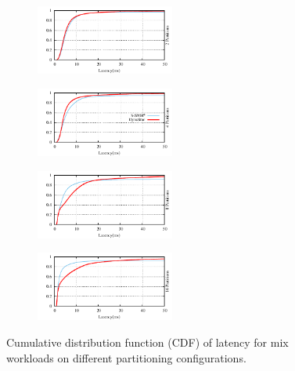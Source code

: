 \begin{figure}[h!]
  \centering
  \begin{subfigure}{\columnwidth}
    \centering
    \includegraphics[width=0.5\textwidth]{./figures/experiments/dynastar/chirper-latency-cdf-2p.pdf}
  \end{subfigure}
  \begin{subfigure}{\columnwidth}
    \centering
    \includegraphics[width=0.5\textwidth]{./figures/experiments/dynastar/chirper-latency-cdf-4p.pdf}
  \end{subfigure}
  \begin{subfigure}{\columnwidth}
    \centering
    \includegraphics[width=0.5\textwidth]{./figures/experiments/dynastar/chirper-latency-cdf-8p.pdf}
  \end{subfigure}
  \begin{subfigure}{\columnwidth}
    \centering
    \includegraphics[width=0.5\textwidth]{./figures/experiments/dynastar/chirper-latency-cdf-16p.pdf}
  \end{subfigure}
  \caption{Cumulative distribution function (CDF) of latency for mix workloads on different partitioning configurations.}
  \label{fig:socialcdf}
\end{figure}



